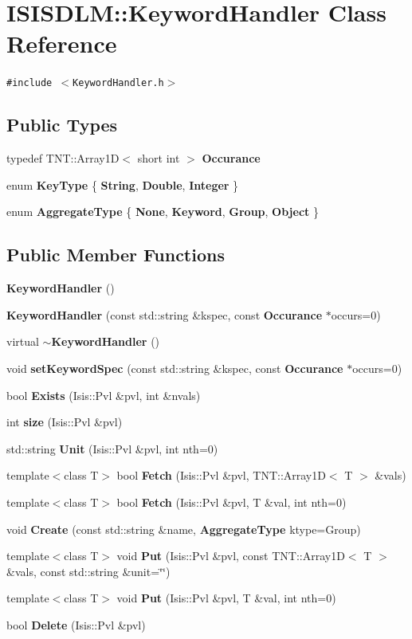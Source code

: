\section{ISISDLM::Keyword\-Handler Class Reference}
\label{classISISDLM_1_1KeywordHandler}
{\tt \#include $<$Keyword\-Handler.h$>$}

\subsection*{Public Types}
\begin{CompactItemize}
\item 
typedef TNT::Array1D$<$ short int $>$ {\bf Occurance}
\item 
enum {\bf Key\-Type} \{ {\bf String}, 
{\bf Double}, 
{\bf Integer}
 \}
\item 
enum {\bf Aggregate\-Type} \{ {\bf None}, 
{\bf Keyword}, 
{\bf Group}, 
{\bf Object}
 \}
\end{CompactItemize}
\subsection*{Public Member Functions}
\begin{CompactItemize}
\item 
{\bf Keyword\-Handler} ()
\item 
{\bf Keyword\-Handler} (const std::string \&kspec, const {\bf Occurance} $\ast$occurs=0)
\item 
virtual {\bf $\sim$Keyword\-Handler} ()
\item 
void {\bf set\-Keyword\-Spec} (const std::string \&kspec, const {\bf Occurance} $\ast$occurs=0)
\item 
bool {\bf Exists} (Isis::Pvl \&pvl, int \&nvals)
\item 
int {\bf size} (Isis::Pvl \&pvl)
\item 
std::string {\bf Unit} (Isis::Pvl \&pvl, int nth=0)
\item 
template$<$class T$>$ bool {\bf Fetch} (Isis::Pvl \&pvl, TNT::Array1D$<$ T $>$ \&vals)
\item 
template$<$class T$>$ bool {\bf Fetch} (Isis::Pvl \&pvl, T \&val, int nth=0)
\item 
void {\bf Create} (const std::string \&name, {\bf Aggregate\-Type} ktype=Group)
\item 
template$<$class T$>$ void {\bf Put} (Isis::Pvl \&pvl, const TNT::Array1D$<$ T $>$ \&vals, const std::string \&unit=\char`\"{}\char`\"{})
\item 
template$<$class T$>$ void {\bf Put} (Isis::Pvl \&pvl, T \&val, int nth=0)
\item 
bool {\bf Delete} (Isis::Pvl \&pvl)
\end{CompactItemize}
